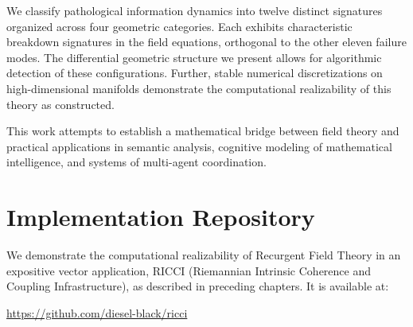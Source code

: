 \documentclass[11pt, a4paper]{report}
\begin{document}
We classify pathological information dynamics into twelve distinct signatures organized across four geometric categories. Each exhibits characteristic breakdown signatures in the field equations, orthogonal to the other eleven failure modes. The differential geometric structure we present allows for algorithmic detection of these configurations. Further, stable numerical discretizations on high-dimensional manifolds demonstrate the computational realizability of this theory as constructed.

\vspace{1em}

This work attempts to establish a mathematical bridge between field theory and practical applications in semantic analysis, cognitive modeling of mathematical intelligence, and systems of multi-agent coordination.

\tableofcontents


















\appendix
\chapter{Implementation Repository}
\label{appendix:implementation}

We demonstrate the computational realizability of Recurgent Field Theory in an expositive vector application, RICCI (Riemannian Intrinsic Coherence and Coupling Infrastructure), as described in preceding chapters. It is available at:

\begin{center}
\url{https://github.com/diesel-black/ricci}
\end{center}
\end{document}
